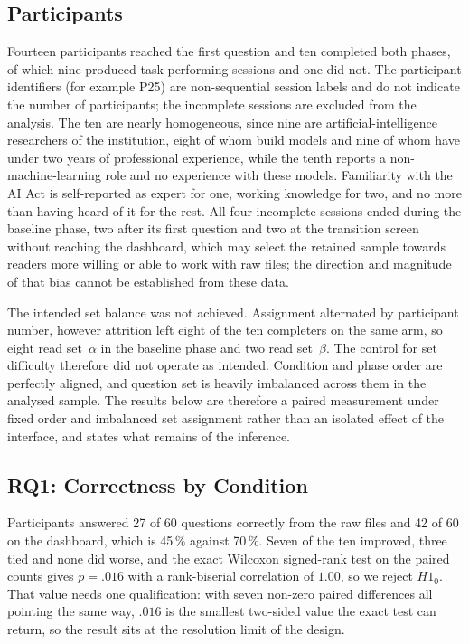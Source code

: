 \documentclass[10pt,conference,a4paper]{IEEEtran}
\begin{document}
\subsection{Participants}
Fourteen participants reached the first question and ten completed both phases, of which nine produced task-performing sessions and one did not.
The participant identifiers (for example P25) are non-sequential session labels and do not indicate the number of participants; the incomplete sessions are excluded from the analysis.
The ten are nearly homogeneous, since nine are artificial-intelligence researchers of the institution, eight of whom build models and nine of whom have under two years of professional experience, while the tenth reports a non-machine-learning role and no experience with these models.
Familiarity with the AI Act is self-reported as expert for one, working knowledge for two, and no more than having heard of it for the rest.
All four incomplete sessions ended during the baseline phase, two after its first question and two at the transition screen without reaching the dashboard, which may select the retained sample towards readers more willing or able to work with raw files; the direction and magnitude of that bias cannot be established from these data.

The intended set balance was not achieved.
Assignment alternated by participant number, however attrition left eight of the ten completers on the same arm, so eight read set~$\alpha$ in the baseline phase and two read set~$\beta$.
The control for set difficulty therefore did not operate as intended.
Condition and phase order are perfectly aligned, and question set is heavily imbalanced across them in the analysed sample.
The results below are therefore a paired measurement under fixed order and imbalanced set assignment rather than an isolated effect of the interface, and  states what remains of the inference.

\subsection{RQ1: Correctness by Condition}
Participants answered 27 of 60 questions correctly from the raw files and 42 of 60 on the dashboard, which is 45\,\% against 70\,\%.
Seven of the ten improved, three tied and none did worse, and the exact Wilcoxon signed-rank test on the paired counts gives $p = .016$ with a rank-biserial correlation of $1.00$, so we reject $H1_0$.
That value needs one qualification: with seven non-zero paired differences all pointing the same way, $.016$ is the smallest two-sided value the exact test can return, so the result sits at the resolution limit of the design.
\end{document}

